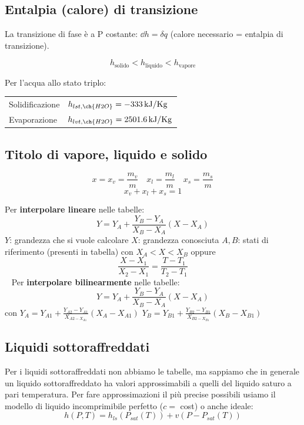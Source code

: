 \subsection{Entalpia (calore) di transizione}
La transizione di fase è a P costante: $\dd{h} = \delta q$ (calore necessario = entalpia di transizione).

\[ h_\text{solido} < h_\text{liquido} < h_\text{vapore} \]

Per l'acqua allo stato triplo:
\begin{tabular}{ll}
    Solidificazione & $h_{lst,\ch{H2O}} = \SI{-333}{kJ/Kg}$ \\
    Evaporazione & $h_{lvt,\ch{H2O}} = \SI{2501.6}{kJ/Kg}$
\end{tabular}

\subsection{Titolo di vapore, liquido e solido}
\[ x = x_v = \frac{m_v}{m} \quad x_l = \frac{m_l}{m} \quad x_s = \frac{m_s}{m} \]
\[ x_v + x_l + x_s = 1 \]

Per \textbf{interpolare lineare} nelle tabelle:
\[ Y = Y_A + \frac{Y_B-Y_A}{X_B-X_A}(X-X_A) \]
$Y$: grandezza che si vuole calcolare \newline
$X$: grandezza conosciuta \newline
$A, B$: stati di riferimento (presenti in tabella) con $X_A < X < X_B$ \newline
oppure
\[ \frac{X-X_1}{X_2-X_1} = \frac{T-T_1}{T_2-T_1} \]
\ \newline \newline
Per \textbf{interpolare bilinearmente} nelle tabelle:
\[ Y = Y_A + \frac{Y_B-Y_A}{X_B-X_A}(X-X_A) \]
con
$Y_A = Y_{A1} + \frac{Y_{A2} - Y_{A1}}{X_{A2 - X_{A1}}}(X_A-X_{A1})$
$Y_B = Y_{B1} + \frac{Y_{B2} - Y_{B1}}{X_{B2 - X_{B1}}}(X_B-X_{B1})$

\subsection{Liquidi sottoraffreddati}

Per i liquidi sottoraffreddati non abbiamo le tabelle, ma sappiamo che in generale un liquido sottoraffreddato ha valori approssimabili a quelli del liquido saturo a pari temperatura. Per fare approssimazioni il più precise possibili usiamo il modello di liquido incomprimibile perfetto ($c = $ cost) o anche ideale:
\[
    h(P,T) = h_{ls}(P_{sat}(T)) + v (P - P_{sat}(T))
\]

